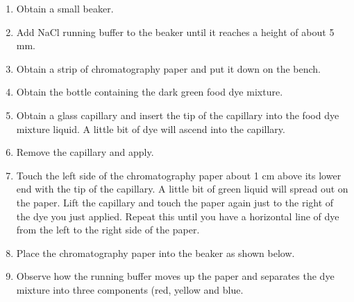 \documentclass[]{book}
\providecommand{\tightlist}{%
  \setlength{\itemsep}{0pt}\setlength{\parskip}{0pt}}
\begin{document}
\begin{enumerate}
\def\labelenumi{\arabic{enumi}.}
\tightlist
\item
  Obtain a small beaker.
\item
  Add NaCl running buffer to the beaker until it reaches a height of about 5 mm.
\item
  Obtain a strip of chromatography paper and put it down on the bench.
\item
  Obtain the bottle containing the dark green food dye mixture.
\item
  Obtain a glass capillary and insert the tip of the capillary into the food dye mixture liquid. A little bit of dye will ascend into the capillary.
\item
  Remove the capillary and apply.
\item
  Touch the left side of the chromatography paper about 1 cm above its lower end with the tip of the capillary. A little bit of green liquid will spread out on the paper. Lift the capillary and touch the paper again just to the right of the dye you just applied. Repeat this until you have a horizontal line of dye from the left to the right side of the paper.
\item
  Place the chromatography paper into the beaker as shown below.
\item
  Observe how the running buffer moves up the paper and separates the dye mixture into three components (red, yellow and blue.
\end{enumerate}
\end{document}
